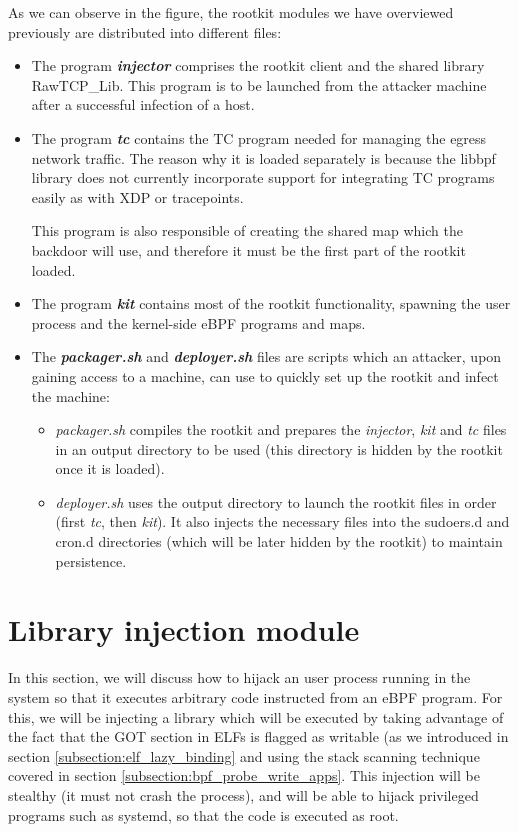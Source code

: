 As we can observe in the figure, the rootkit modules we have overviewed previously are distributed into different files:
\begin{itemize}
\item The program \textit{\textbf{injector}} comprises the rootkit client and the shared library RawTCP\_Lib. This program is to be launched from the attacker machine after a successful infection of a host.
\item The program \textit{\textbf{tc}} contains the TC program needed for managing the egress network traffic. The reason why it is loaded separately is because the libbpf library does not currently incorporate support for integrating TC programs easily as with XDP or tracepoints.

This program is also responsible of creating the shared map which the backdoor will use, and therefore it must be the first part of the rootkit loaded.
\item The program \textit{\textbf{kit}} contains most of the rootkit functionality, spawning the user process and the kernel-side eBPF programs and maps.
\item The \textit{\textbf{packager.sh}} and \textit{\textbf{deployer.sh}} files are scripts which an attacker, upon gaining access to a machine, can use to quickly set up the rootkit and infect the machine:
\begin{itemize}
	\item \textit{packager.sh} compiles the rootkit and prepares the \textit{injector}, \textit{kit} and \textit{tc} files in an output directory to be used (this directory is hidden by the rootkit once it is loaded).
	\item \textit{deployer.sh} uses the output directory to launch the rootkit files in order (first \textit{tc}, then \textit{kit}). It also injects the necessary files into the sudoers.d and cron.d directories (which will be later hidden by the rootkit) to maintain persistence.
\end{itemize}
\end{itemize}



\section{Library injection module} \label{section:lib_injection}
In this section, we will discuss how to hijack an user process running in the system so that it executes arbitrary code instructed from an eBPF program. For this, we will be injecting a library which will be executed by taking advantage of the fact that the GOT section in ELFs is flagged as writable (as we introduced in section \ref{subsection:elf_lazy_binding} and using the stack scanning technique covered in section \ref{subsection:bpf_probe_write_apps}. This injection will be stealthy (it must not crash the process), and will be able to hijack privileged programs such as systemd, so that the code is executed as root.

